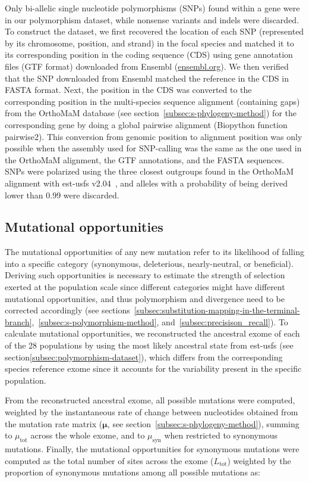 \documentclass[10pt,letterpaper]{article}
\providecommand{\DIFaddtex}[1]{{\protect\color{blue}\uwave{#1}}} %
\providecommand{\DIFaddbegin}{} %
\providecommand{\DIFaddend}{} %
\providecommand{\DIFadd}[1]{\texorpdfstring{\DIFaddtex{#1}}{#1}} %
\newcommand{\DIFaddincludegraphics}[2][]{{\color{blue}\fbox{\DIFOincludegraphics[#1]{#2}}}} %
\DeclareRobustCommand{\DIFaddbegin}{\DIFOaddbegin \let\includegraphics\DIFaddincludegraphics} %
\DeclareRobustCommand{\DIFaddend}{\DIFOaddend \let\includegraphics\DIFOincludegraphics} %
\begin{document}
Only bi-allelic single nucleotide polymorphisms (SNPs) found within a gene were in our polymorphism dataset, while nonsense variants and indels were discarded.
To construct the dataset, we first recovered the location of each SNP (represented by its chromosome, position, and strand) in the focal species and matched it to its corresponding position in the coding sequence (CDS) using gene annotation files (GTF format) downloaded from Ensembl (\url{ensembl.org}).
We then verified that the SNP downloaded from Ensembl matched the reference in the CDS in FASTA format.
Next, the position in the CDS was converted to the corresponding position in the multi-species sequence alignment (containing gaps) from the OrthoMaM database (see section~\ref{subsec:s-phylogeny-method}) for the corresponding gene by doing a global pairwise alignment (Biopython function pairwise2).
This conversion from genomic position to alignment position was only possible when the assembly used for SNP-calling was the same as the one used in the OrthoMaM alignment, the GTF annotations, and the FASTA sequences.
SNPs were polarized using the three closest outgroups found in the OrthoMaM alignment with est-usfs v2.04~\cite{keightley_inferring_2018}, and alleles with a probability of being derived lower than 0.99 were discarded.

\subsection{Mutational opportunities}
\label{subsec:nunber-of-sites}
The mutational opportunities of any new mutation refer to its likelihood of falling into a specific category (synonymous, deleterious, nearly-neutral, or beneficial).
Deriving such opportunities is necessary to estimate the strength of selection exerted at the population scale since different categories might have different mutational opportunities, and thus polymorphism and divergence need to be corrected accordingly (see sections~\ref{subsec:substitution-mapping-in-the-terminal-branch},~\ref{subsec:s-polymorphism-method}, and~\ref{subsec:precisison_recall}).
To calculate mutational opportunities, we reconstructed the ancestral exome of each of the 28 populations by using the most likely ancestral state from est-usfs (see section\DIFaddbegin \DIFadd{~}\DIFaddend \ref{subsec:polymorphism-dataset}), which differs from the corresponding species reference exome since it accounts for the variability present in the specific population.

From the reconstructed ancestral exome, all possible mutations were computed, weighted by the instantaneous rate of change between nucleotides obtained from the mutation rate matrix ($\bm{\mu}$, see section~\ref{subsec:s-phylogeny-method}), summing to $\mu_{\text{tot}}$ across the whole exome, and to $\mu_{\text{syn}}$ when restricted to synonymous mutations.
Finally, the mutational opportunities for synonymous mutations were computed as the total number of sites across the exome ($L_{\text{tot}}$) weighted by the proportion of synonymous mutations among all possible mutations as:
\end{document}
